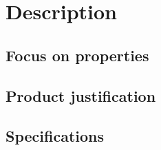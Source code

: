 \documentclass[../main.tex]{subfiles}
\begin{document}
\pagebreak
\section{Description}

    \subsection{Focus on properties}
    
    \subsection{Product justification}
    
    \subsection{Specifications}
\end{document}
